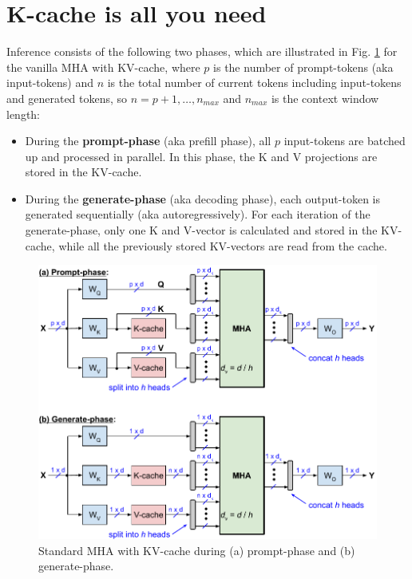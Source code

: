 \documentclass{article}
\begin{document}
\section{K-cache is all you need}
Inference consists of the following two phases, which are illustrated in Fig. \ref{fig2} for the vanilla MHA with KV-cache, where $p$ is the number of prompt-tokens (aka input-tokens) and $n$ is the total number of current tokens including input-tokens and generated tokens, so $n = p+1, \ldots, n_{max}$ and $n_{max}$ is the context window length:
\begin{itemize}[topsep=-1pt, itemsep=-1pt]
  \item During the \textbf{prompt-phase} (aka prefill phase), all $p$ input-tokens are batched up and processed in parallel. In this phase, the K and V projections are stored in the KV-cache.
  \item During the \textbf{generate-phase} (aka decoding phase), each output-token is generated sequentially (aka autoregressively). For each iteration of the generate-phase, only one K and V-vector is calculated and stored in the KV-cache, while all the previously stored KV-vectors are read from the cache.
\end{itemize}
\begin{figure}[h!] \centering
  \includegraphics[scale=0.9]{figs/slim_fig2.pdf}
  \caption{Standard MHA with KV-cache during (a) prompt-phase and (b) generate-phase.}
\label{fig2} \end{figure}
\end{document}
